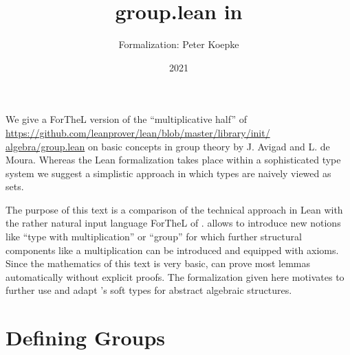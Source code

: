 \documentclass{article}
\title{group.lean in \Naproche}
\author{\Naproche Formalization: Peter Koepke}
\date{2021}
\begin{document}

\maketitle

\begin{forthel}
\end{forthel}

\noindent We give a ForTheL version of the ``multiplicative half'' of
\url{https://github.com/leanprover/lean/blob/master/library/init/
algebra/group.lean} on basic concepts in group theory
by J. Avigad and L. de Moura.
Whereas the Lean formalization takes place within a sophisticated type system
we suggest a simplistic approach in which types are naively viewed as sets.

The purpose of this text is a comparison of the technical approach in Lean
with the rather natural input language ForTheL of \Naproche{}.
\Naproche{} allows to introduce new notions like ``type with multiplication''
or ``group'' for which further structural components like a multiplication can
be introduced and equipped with axioms. Since the mathematics of this
text is very basic, \Naproche{} can prove most lemmas automatically without
explicit proofs. The formalization given here motivates to further
use and adapt \Naproche{}'s soft types for abstract algebraic structures.


\section{Defining Groups}
\end{document}
